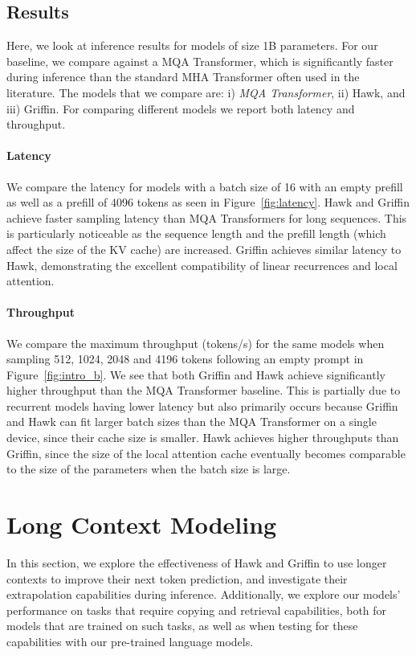 \documentclass[11pt, a4paper, logo, onecolumn]{googledeepmind}
\theoremstyle{definition}
\begin{document}
\subsection{Results}
Here, we look at inference results for models of size 1B parameters. For our baseline, we compare against a MQA Transformer, which is significantly faster during inference than the standard MHA Transformer often used in the literature. The models that we compare are: i) \textit{MQA Transformer}, ii) Hawk, and iii) Griffin. For comparing different models we report both latency and throughput.


\paragraph{Latency}
We compare the latency for models with a batch size of 16 with an empty prefill as well as a prefill of 4096 tokens as seen in Figure~\ref{fig:latency}. 
Hawk and Griffin achieve faster sampling latency than MQA Transformers for long sequences. This is particularly noticeable as the sequence length and the prefill length (which affect the size of the KV cache) are increased. Griffin achieves similar latency to Hawk, demonstrating the excellent compatibility of linear recurrences and local attention.


\paragraph{Throughput}
We compare the maximum throughput (tokens/s) for the same models when sampling 512, 1024, 2048 and 4196 tokens following an empty prompt in Figure~\ref{fig:intro_b}. 
We see that both Griffin and Hawk achieve significantly higher throughput than the MQA Transformer baseline. 
This is partially due to recurrent models having lower latency but also primarily occurs because Griffin and Hawk can fit larger batch sizes than the MQA Transformer on a single device, since their cache size is smaller. Hawk achieves higher throughputs than Griffin, since the size of the local attention cache eventually becomes comparable to the size of the parameters when the batch size is large.





\section{Long Context Modeling}
\label{sec:long_seq}

In this section, we explore the effectiveness of Hawk and Griffin to use longer contexts to improve their next token prediction, and investigate their extrapolation capabilities during inference. 
Additionally, we explore our models' performance on tasks that require copying and retrieval capabilities, both for models that are trained on such tasks, as well as when testing for these capabilities with our pre-trained language models.
\end{document}

